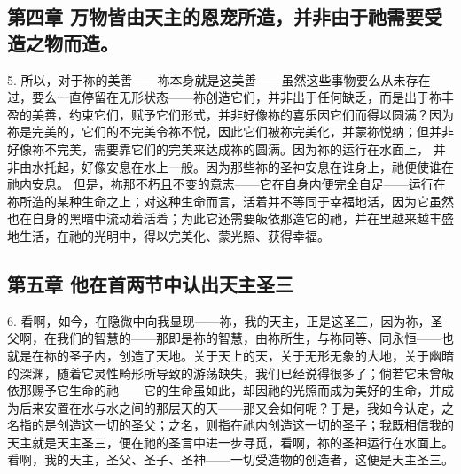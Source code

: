 
\subsection{第四章 万物皆由天主的恩宠所造，并非由于祂需要受造之物而造。}

5. 所以，对于祢的美善——祢本身就是这美善——虽然这些事物要么从未存在过，要么一直停留在无形状态——祢创造它们，并非出于任何缺乏，而是出于祢丰盈的美善，约束它们，赋予它们形式，并非好像祢的喜乐因它们而得以圆满？因为祢是完美的，它们的不完美令祢不悦，因此它们被祢完美化，并蒙祢悦纳；但并非好像祢不完美，需要靠它们的完美来达成祢的圆满。因为祢的运行在水面上， 并非由水托起，好像安息在水上一般。因为那些祢的圣神安息在谁身上，祂便使谁在祂内安息。 但是，祢那不朽且不变的意志——它在自身内便完全自足——运行在祢所造的某种生命之上；对这种生命而言，活着并不等同于幸福地活，因为它虽然也在自身的黑暗中流动着活着；为此它还需要皈依那造它的祂，并在里越来越丰盛地生活，在祂的光明中，得以完美化、蒙光照、获得幸福。\par


\subsection{第五章 他在首两节中认出天主圣三}

6. 看啊，如今，在隐微中向我显现——祢，我的天主，正是这圣三，因为祢，圣父啊，在我们的智慧的——那即是祢的智慧，由祢所生，与祢同等、同永恒——也就是在祢的圣子内，创造了天地。关于天上的天，关于无形无象的大地，关于幽暗的深渊，随着它灵性畸形所导致的游荡缺失，我们已经说得很多了；倘若它未曾皈依那赐予它生命的祂——它的生命虽如此，却因祂的光照而成为美好的生命，并成为后来安置在水与水之间的那层天的天——那又会如何呢？于是，我如今认定，之名指的是创造这一切的圣父；之名，则指在祂内创造这一切的圣子；我既相信我的天主就是天主圣三，便在祂的圣言中进一步寻觅，看啊，祢的圣神运行在水面上。看啊，我的天主，圣父、圣子、圣神——一切受造物的创造者，这便是天主圣三。\par


